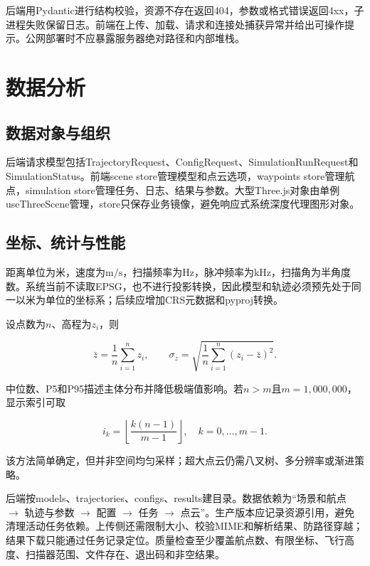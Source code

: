 \documentclass[a4paper,fleqn]{cas-sc}
\begin{document}
后端用Pydantic进行结构校验，资源不存在返回404，参数或格式错误返回4xx，子进程失败保留日志。前端在上传、加载、请求和连接处捕获异常并给出可操作提示。公网部署时不应暴露服务器绝对路径和内部堆栈。

\section{数据分析}

\subsection{数据对象与组织}

后端请求模型包括TrajectoryRequest、ConfigRequest、SimulationRunRequest和SimulationStatus。前端scene store管理模型和点云选项，waypoints store管理航点，simulation store管理任务、日志、结果与参数。大型Three.js对象由单例useThreeScene管理，store只保存业务镜像，避免响应式系统深度代理图形对象。

\subsection{坐标、统计与性能}

距离单位为米，速度为$\text{m/s}$，扫描频率为$\text{Hz}$，脉冲频率为$\text{kHz}$，扫描角为半角度数。系统当前不读取EPSG，也不进行投影转换，因此模型和轨迹必须预先处于同一以米为单位的坐标系；后续应增加CRS元数据和pyproj转换。

设点数为$n$、高程为$z_i$，则

\begin{equation}
\bar{z} = \frac{1}{n}\sum_{i=1}^{n} z_i, \qquad
\sigma_z = \sqrt{\frac{1}{n}\sum_{i=1}^{n} (z_i - \bar{z})^2}.
\end{equation}

中位数、P5和P95描述主体分布并降低极端值影响。若$n > m$且$m = 1,000,000$，显示索引可取

\begin{equation}
i_k = \left\lfloor \frac{k(n-1)}{m-1} \right\rfloor, \quad k = 0, \dots, m-1.
\end{equation}

该方法简单确定，但并非空间均匀采样；超大点云仍需八叉树、多分辨率或渐进策略\citep{pointCloudRendering,pointCloudTerrain}。

后端按models、trajectories、configs、results建目录。数据依赖为“场景和航点 $\rightarrow$ 轨迹与参数 $\rightarrow$ 配置 $\rightarrow$ 任务 $\rightarrow$ 点云”。生产版本应记录资源引用，避免清理活动任务依赖。上传侧还需限制大小、校验MIME和解析结果、防路径穿越；结果下载只能通过任务记录定位。质量检查至少覆盖航点数、有限坐标、飞行高度、扫描器范围、文件存在、退出码和非空结果。
\end{document}
